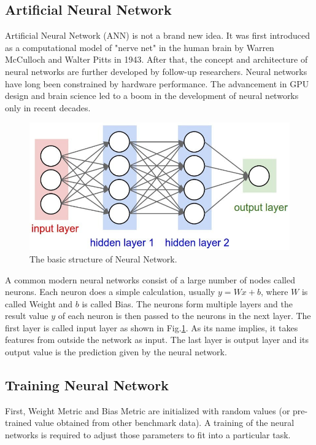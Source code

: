 \subsection{Artificial Neural Network}

Artificial Neural Network (ANN) is not a brand new idea. It was first introduced as a computational model of "nerve net" in the human brain by Warren McCulloch and Walter Pitts \cite{McCulloch1943} in 1943. After that, the concept and architecture of neural networks are further developed by follow-up researchers. Neural networks have long been constrained by hardware performance. The advancement in GPU design and brain science led to a boom in the development of neural networks only in recent decades. 

\begin{figure}[H]
  \includegraphics[width=\linewidth]{figures/ann.jpg}
  \caption{The basic structure of Neural Network.}
  \label{fig:ann}
\end{figure}

A common modern neural networks consist of a large number of nodes called neurons. Each neuron does a simple calculation, usually $y = Wx + b$, where $W$ is called Weight and $b$ is called Bias. The neurons form multiple layers and the result value $y$ of each neuron is then passed to the neurons in the next layer. The first layer is called input layer as shown in Fig.\ref{fig:ann}. As its name implies, it takes features from outside the network as input. The last layer is output layer and its output value is the prediction given by the neural network.

\subsection{Training Neural Network}

First, Weight Metric and Bias Metric are initialized with random values (or pre-trained value obtained from other benchmark data). A training of the neural networks is required to adjust those parameters to fit into a particular task.

